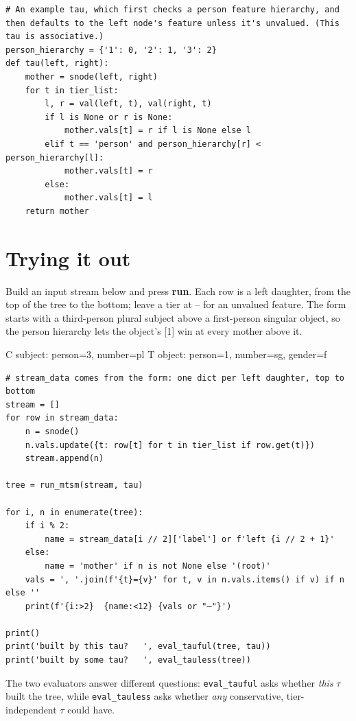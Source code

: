 \begin{verbatim}
# An example tau, which first checks a person feature hierarchy, and then defaults to the left node's feature unless it's unvalued. (This tau is associative.)
person_hierarchy = {'1': 0, '2': 1, '3': 2}
def tau(left, right):
    mother = snode(left, right)
    for t in tier_list:
        l, r = val(left, t), val(right, t)
        if l is None or r is None:
            mother.vals[t] = r if l is None else l
        elif t == 'person' and person_hierarchy[r] < person_hierarchy[l]:
            mother.vals[t] = r
        else: 
            mother.vals[t] = l
    return mother
\end{verbatim}

\section{Trying it out}\label{sec:mtsm-try}

Build an input stream below and press \textbf{run}. Each row is a left daughter, from the top of the tree to the bottom; leave a tier at -- for an unvalued feature. The form starts with a third-person plural subject above a first-person singular object, so the person hierarchy lets the object's [1] win at every mother above it.

\begin{nodestream}[person=1/2/3, number=sg/pl, gender=m/f]
C
subject: person=3, number=pl
T
object: person=1, number=sg, gender=f
\end{nodestream}

\begin{verbatim}
# stream_data comes from the form: one dict per left daughter, top to bottom
stream = []
for row in stream_data:
    n = snode()
    n.vals.update({t: row[t] for t in tier_list if row.get(t)})
    stream.append(n)

tree = run_mtsm(stream, tau)

for i, n in enumerate(tree):
    if i % 2:
        name = stream_data[i // 2]['label'] or f'left {i // 2 + 1}'
    else:
        name = 'mother' if n is not None else '(root)'
    vals = ', '.join(f'{t}={v}' for t, v in n.vals.items() if v) if n else ''
    print(f'{i:>2}  {name:<12} {vals or "–"}')

print()
print('built by this tau?   ', eval_tauful(tree, tau))
print('built by some tau?   ', eval_tauless(tree))
\end{verbatim}

The two evaluators answer different questions: \texttt{eval\_tauful} asks whether \emph{this} $\tau$ built the tree, while \texttt{eval\_tauless} asks whether \emph{any} conservative, tier-independent $\tau$ could have.
